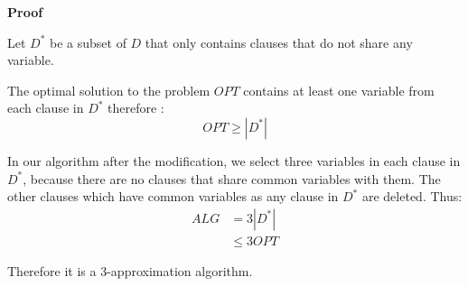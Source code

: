 \textbf{Proof}

Let $ D^* $ be a subset of $ D $ that only contains clauses that do not share any variable.

The optimal solution to the problem $ OPT $ contains at least one variable from each clause in $D^*$ therefore :
$$ OPT \ge |D^*|$$ 

In our algorithm after the modification, we select three variables in each clause in $ D^* $,
because there are no clauses that share common variables with them.
The other clauses which have common variables as any clause in $ D^* $ are deleted.
Thus:
\begin{align*}
	ALG &= 3 |D^*| \\
	&\leq 3 OPT
\end{align*}

Therefore it is a 3-approximation algorithm.
